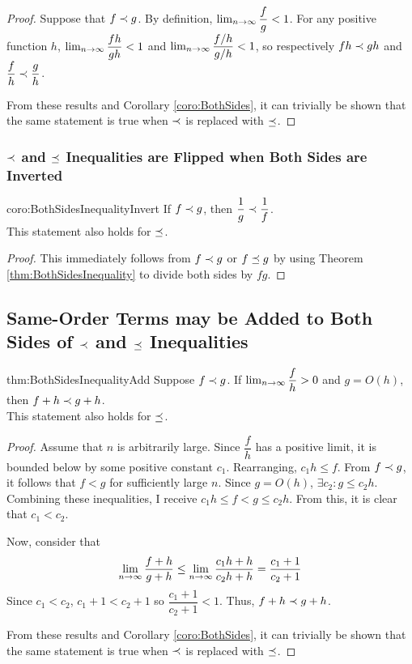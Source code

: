 \begin{proof}
	Suppose that $f \prec g$. By definition, $\lim_{n \to \infty} \dfrac{f}{g} < 1$. For any positive function $h$, $\lim_{n \to \infty} \dfrac{fh}{gh} < 1$ and $\lim_{n \to \infty} \dfrac{f / h}{g / h} < 1$, so respectively $fh \prec gh$ and $\dfrac{f}{h} \prec \dfrac{g}{h}$.
	
	From these results and Corollary \ref{coro:BothSides}, it can trivially be shown that the same statement is true when $\prec$ is replaced with $\preceq$.
\end{proof}

\subsubsection{$\prec$ and $\preceq$ Inequalities are Flipped when Both Sides are Inverted}

\begin{repcorollary}{coro:BothSidesInequalityInvert}
	If $f \prec g$, then $\dfrac{1}{g} \prec \dfrac{1}{f}$.\\
	This statement also holds for $\preceq$.
\end{repcorollary}

\begin{proof}
	This immediately follows from $f \prec g$ or $f \preceq g$ by using Theorem \ref{thm:BothSidesInequality} to divide both sides by $fg$.
\end{proof}

\subsection{Same-Order Terms may be Added to Both Sides of $\prec$ and $\preceq$ Inequalities}

\begin{reptheorem}{thm:BothSidesInequalityAdd}
	Suppose $f \prec g$. If $\lim_{n \to \infty} \dfrac{f}{h} > 0$ and $g = O(h)$, then $f + h \prec g + h$.\\
	This statement also holds for $\preceq$.
\end{reptheorem}

\begin{proof}
	Assume that $n$ is arbitrarily large. Since $\dfrac{f}{h}$ has a positive limit, it is bounded below by some positive constant $c_1$. Rearranging, $c_1 h \leq f$. From $f \prec g$, it follows that $f < g$ for sufficiently large $n$. Since $g = O(h)$, $\exists c_2 : g \leq c_2 h$. Combining these inequalities, I receive $c_1 h \leq f < g \leq c_2 h$. From this, it is clear that $c_1 < c_2$.
	
	Now, consider that
	\begin{align*}
	\lim_{n \to \infty} \frac{f + h}{g + h} \leq \lim_{n \to \infty} \frac{c_1 h + h}{c_2 h + h} = \frac{c_1 + 1}{c_2 + 1}
	\end{align*}
	Since $c_1 < c_2$, $c_1 + 1 < c_2 + 1$ so $\dfrac{c_1 + 1}{c_2 + 1} < 1$. Thus, $f + h \prec g + h$.
	
	From these results and Corollary \ref{coro:BothSides}, it can trivially be shown that the same statement is true when $\prec$ is replaced with $\preceq$.
\end{proof}